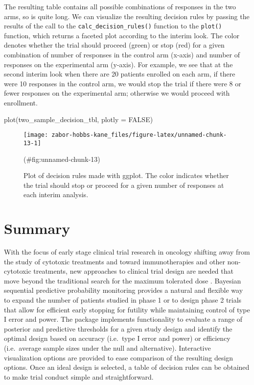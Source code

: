 The resulting table contains all possible combinations of responses in
the two arms, so is quite long. We can visualize the resulting decision
rules by passing the results of the call to the
\texttt{calc\_decision\_rules()} function to the \texttt{plot()}
function, which returns a faceted plot according to the interim look.
The color denotes whether the trial should proceed (green) or stop (red)
for a given combination of number of responses in the control arm
(x-axis) and number of responses on the experimental arm (y-axis). For
example, we see that at the second interim look when there are 20
patients enrolled on each arm, if there were 10 responses in the control
arm, we would stop the trial if there were 8 or fewer responses on the
experimental arm; otherwise we would proceed with enrollment.

\begin{Schunk}
\begin{Sinput}
plot(two_sample_decision_tbl, plotly = FALSE)
\end{Sinput}
\begin{figure}
\texttt{[image: zabor-hobbs-kane\_files/figure-latex/unnamed-chunk-13-1]} \caption[Plot of decision rules made with ggplot]{Plot of decision rules made with ggplot. The color indicates whether the trial should stop or proceed for a given number of responses at each interim analysis.}(\#fig:unnamed-chunk-13)
\end{figure}
\end{Schunk}

\hypertarget{summary}{%
\section{Summary}\label{summary}}

With the focus of early stage clinical trial research in oncology
shifting away from the study of cytotoxic treatments and toward
immunotherapies and other non-cytotoxic treatments, new approaches to
clinical trial design are needed that move beyond the traditional search
for the maximum tolerated dose \citep{Hobbs2019}. Bayesian sequential
predictive probability monitoring provides a natural and flexible way to
expand the number of patients studied in phase 1 or to design phase 2
trials that allow for efficient early stopping for futility while
maintaining control of type I error and power. The 
package implements functionality to evaluate a range of posterior and
predictive thresholds for a given study design and identify the optimal
design based on accuracy (i.e.~type I error and power) or efficiency
(i.e.~average sample sizes under the null and alternative). Interactive
visualization options are provided to ease comparison of the resulting
design options. Once an ideal design is selected, a table of decision
rules can be obtained to make trial conduct simple and straightforward.

